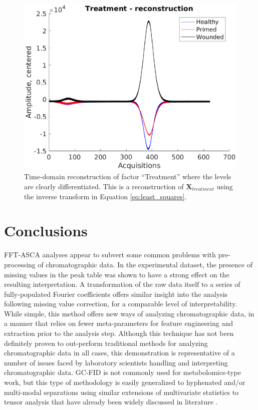 \documentclass[preprint,12pt]{elsarticle}
\begin{document}
\begin{figure}[hbt!]
    \centering
    \includegraphics[width=0.9\linewidth]{time_treat.eps}
    \caption{Time-domain reconstruction of factor ``Treatment'' where the levels are clearly differentiated. This is a reconstruction of $\mathbf{X}_{treatment}$ using the inverse transform in Equation \ref{eq:least_squares}.}
    \label{fig:freq_treat}
\end{figure}


\section{Conclusions}

FFT-ASCA analyses appear to subvert some common problems with pre-processing of chromatographic data. In the experimental dataset, the presence of missing values in the peak table was shown to have a strong effect on the resulting interpretation. A transformation of the raw data itself to a series of fully-populated Fourier coefficients offers similar insight into the analysis following missing value correction, for a comparable level of interpretability. While simple, this method offers new ways of analyzing chromatographic data, in a manner that relies on fewer meta-parameters for feature engineering and extraction prior to the analysis step. Although this technique has not been definitely proven to out-perform traditional methods for analyzing chromatographic data in all cases, this demonstration is representative of a number of issues faced by laboratory scientists handling and interpreting chromatographic data. GC-FID is not commonly used for metabolomics-type work, but this type of methodology is easily generalized to hyphenated and/or multi-modal separations using similar extensions of multivariate statistics to tensor analysis that have already been widely discussed in literature \cite{koleini2023complementary,armstrong2024replicate}. 
\end{document}
